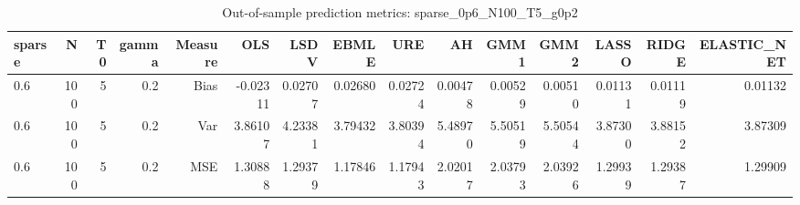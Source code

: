 \begin{table}[!htbp]\centering
\caption{Out-of-sample prediction metrics: sparse_0p6_N100_T5_g0p2}
\label{tab:table3_sparse_0p6_N100_T5_g0p2}
\begin{tabular}{lrrrrrrrrrrrrrr}
\hline
sparse & N & T0 & gamma & Measure & OLS & LSDV & EBMLE & URE & AH & GMM1 & GMM2 & LASSO & RIDGE & ELASTIC_NET \\
\hline
0.6 & 100 & 5 & 0.2 & Bias & -0.02311 & 0.02707 & 0.02680 & 0.02724 & 0.00478 & 0.00529 & 0.00510 & 0.01131 & 0.01119 & 0.01132 \\
0.6 & 100 & 5 & 0.2 & Var & 3.86107 & 4.23381 & 3.79432 & 3.80394 & 5.48970 & 5.50519 & 5.50544 & 3.87300 & 3.88152 & 3.87309 \\
0.6 & 100 & 5 & 0.2 & MSE & 1.30888 & 1.29379 & 1.17846 & 1.17943 & 2.02017 & 2.03793 & 2.03926 & 1.29939 & 1.29387 & 1.29909 \\
\hline
\end{tabular}
\end{table}


